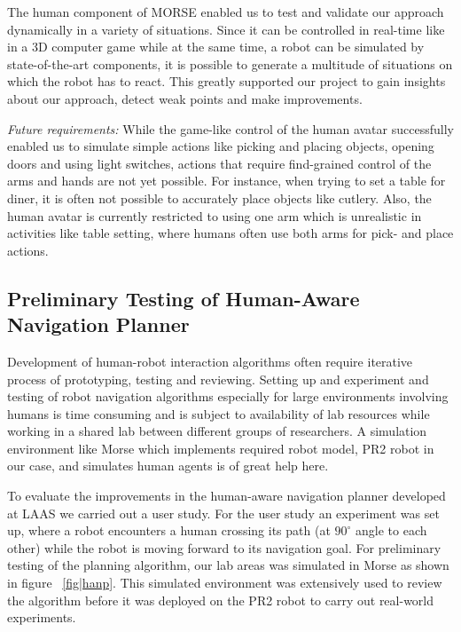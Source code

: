 \documentclass[conference]{IEEEtran}
\begin{document}
The human component of MORSE enabled us to test and validate our approach
dynamically in a variety of situations. Since it can be controlled in real-time
like in a 3D computer game while at the same time, a robot can be simulated by
state-of-the-art components, it is possible to generate a multitude of
situations on which the robot has to react. This greatly supported our project
to gain insights about our approach, detect weak points and make improvements.

\emph{Future requirements:} While the game-like control of the human avatar 
successfully enabled us to simulate simple actions like picking and placing objects, 
opening doors and using light switches, actions that require find-grained control 
of the arms and hands are not yet possible. For instance, when trying to set a table for 
diner, it is often not possible to accurately place objects like cutlery. Also, the human
avatar is currently restricted to using one arm which is unrealistic in activities 
like table setting, where humans often use both arms for pick- and place actions.
 

\subsection{Preliminary Testing of Human-Aware Navigation Planner}
\label{sc:navigation}

Development of human-robot interaction algorithms often require iterative
process of prototyping, testing and reviewing. Setting up and experiment and
testing of robot navigation algorithms especially for large environments
involving humans is time consuming and is subject to availability of lab
resources while working in a shared lab between different groups of
researchers. A simulation environment like Morse which implements required robot
model, PR2 robot in our case, and simulates human agents is of great help here.

To evaluate the improvements in the human-aware navigation planner developed at
LAAS we carried out a user study. For the user study an experiment was set up,
where a robot encounters a human crossing its path (at $90^{\circ }$ angle to
each other) while the robot is moving forward to its navigation goal. For
preliminary testing of the planning algorithm, our lab areas was simulated in
Morse as shown in figure ~\ref{fig|hanp}. This simulated environment was
extensively used to review the algorithm before it was deployed on the PR2 robot
to carry out real-world
experiments. %
\end{document}
